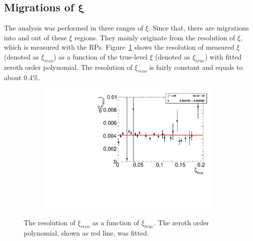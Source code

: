 \subsection[Migrations of $\xi$]{Migrations of $\mathbf{\xi}$}\label{section:star_xi}
The analysis was performed in three ranges of $\xi$. Since that, there are
migrations into and out of these $\xi$ regions. They mainly originate from the resolution of $\xi$, which is measured with the RPs. Figure~\ref{fig:xi_correction_resolution} shows the resolution of measured $\xi$ (denoted as $\xi_{reco}$) as a function of the true-level $\xi$ (denoted as $\xi_{true}$) with fitted zeroth order polynomial. The resolution of $\xi_{reco}$ is fairly constant and equals to about $0.4\%$.


\captionsetup{format=plain,indention=0pt,justification=justified}
\begin{figure}[h!]
	\centering
	\begin{subfigure}{.49\textwidth}
		\includegraphics[width=\textwidth,page=1]{chapters/chrgSTAR/img/xiMigration/RPresolution.pdf}
	\end{subfigure}
		\begin{minipage}{.49\textwidth}
			\caption[The resolution of $\xi_{reco}$ as a function of $\xi_{true}$]{The resolution of $\xi_{reco}$ as a function of $\xi_{true}$. The zeroth order polynomial, shown as red line, was fitted.}
			\label{fig:xi_correction_resolution}
		\end{minipage}
\end{figure}
